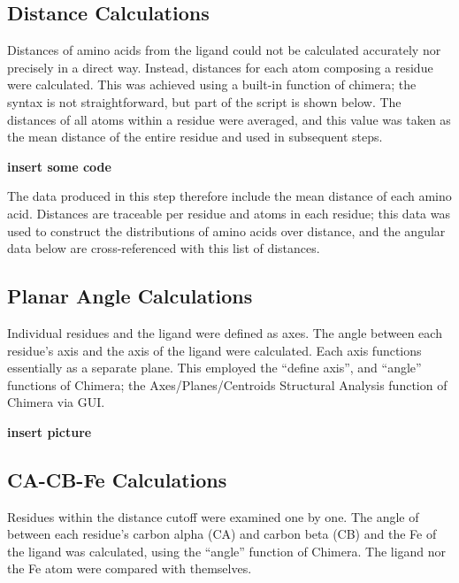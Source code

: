 \documentclass[a4paper, nobind]{templates/ociamthesis}
\begin{document}
\hypertarget{distance-calculations}{%
\subsection{Distance Calculations}\label{distance-calculations}}

Distances of amino acids from the ligand could not be calculated accurately nor precisely in a direct way. Instead, distances for each atom composing a residue were calculated. This was achieved using a built-in function of chimera; the syntax is not straightforward, but part of the script is shown below. The distances of all atoms within a residue were averaged, and this value was taken as the mean distance of the entire residue and used in subsequent steps.

\textbf{insert some code}

The data produced in this step therefore include the mean distance of each amino acid. Distances are traceable per residue and atoms in each residue; this data was used to construct the distributions of amino acids over distance, and the angular data below are cross-referenced with this list of distances.

\hypertarget{planar-angle-calculations}{%
\subsection{Planar Angle Calculations}\label{planar-angle-calculations}}

Individual residues and the ligand were defined as axes. The angle between each residue's axis and the axis of the ligand were calculated. Each axis functions essentially as a separate plane. This employed the ``define axis'', and ``angle'' functions of Chimera; the Axes/Planes/Centroids Structural Analysis function of Chimera via GUI.

\textbf{insert picture}

\hypertarget{ca-cb-fe-calculations}{%
\subsection{CA-CB-Fe Calculations}\label{ca-cb-fe-calculations}}

Residues within the distance cutoff were examined one by one. The angle of between each residue's carbon alpha (CA) and carbon beta (CB) and the Fe of the ligand was calculated, using the ``angle'' function of Chimera. The ligand nor the Fe atom were compared with themselves.
\end{document}
